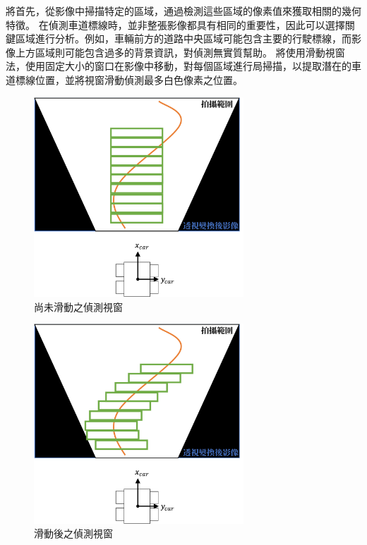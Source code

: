 \documentclass[12pt]{article}       %
\begin{document}
將首先，從影像中掃描特定的區域，通過檢測這些區域的像素值來獲取相關的幾何特徵。
在偵測車道標線時，並非整張影像都具有相同的重要性，因此可以選擇關鍵區域進行分析。例如，車輛前方的道路中央區域可能包含主要的行駛標線，而影像上方區域則可能包含過多的背景資訊，對偵測無實質幫助。
將使用滑動視窗法，使用固定大小的窗口在影像中移動，對每個區域進行局掃描，以提取潛在的車道標線位置，並將視窗滑動偵測最多白色像素之位置。
\begin{figure}[H]
    \centering
    \includegraphics[width=0.7\textwidth]{16.jpg}     %
    \caption{尚未滑動之偵測視窗}    %
    \label{fig:16}    %
\end{figure}

\begin{figure}[H]
    \centering
    \includegraphics[width=0.7\textwidth]{17.jpg}     %
    \caption{滑動後之偵測視窗}    %
    \label{fig:17}    %
\end{figure}
\end{document}

